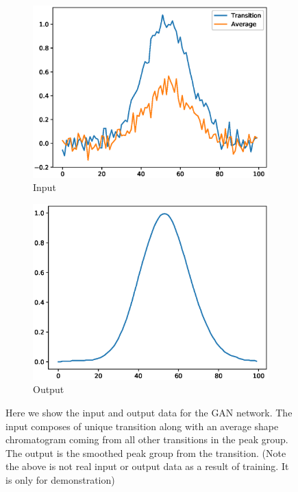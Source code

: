 \documentclass[12pt]{article}
\begin{document}
\begin{figure}
\centering
\begin{subfigure}{.5\textwidth}
  \centering
  \includegraphics[width=1\linewidth]{input}
  \caption{Input}
  \label{fig:sub1}
\end{subfigure}%
\begin{subfigure}{.5\textwidth}
  \centering
  \includegraphics[width=1\linewidth]{output}
  \caption{Output}
  \label{fig:sub2}
\end{subfigure}
\caption{Here we show the input and output data for the GAN network. The input composes of unique transition along with an average shape chromatogram coming from all other transitions in the peak group. The output is the smoothed peak group from the transition. (Note the above is not real input or output data as a result of training. It is only for demonstration)}
\label{fig:test}
\end{figure}
\end{document}
